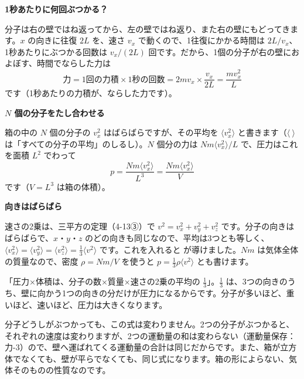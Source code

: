 \noindent\textbf{1秒あたりに何回ぶつかる？}\par\nobreak
分子は右の壁ではね返ってから、左の壁ではね返り、また右の壁にもどってきます。$x$ の向きに往復 $2L$ を、速さ $v_x$ で動くので、1往復にかかる時間は $2L/v_x$、1秒あたりにぶつかる回数は $v_x/(2L)$ 回です。だから、1個の分子が右の壁におよぼす、時間でならした力は
\[ \text{力}=\text{1回の力積}\times\text{1秒の回数}=2mv_x\times\frac{v_x}{2L}=\frac{mv_x^2}{L} \]
です（1秒あたりの力積が、ならした力です）。

\noindent\textbf{$N$ 個の分子をたし合わせる}\par\nobreak
箱の中の $N$ 個の分子の $v_x^2$ はばらばらですが、その平均を $\langle v_x^2\rangle$ と書きます（$\langle\ \rangle$ は「すべての分子の平均」のしるし）。$N$ 個分の力は $Nm\langle v_x^2\rangle/L$ で、圧力はこれを面積 $L^2$ でわって
\[ p=\frac{Nm\langle v_x^2\rangle}{L^3}=\frac{Nm\langle v_x^2\rangle}{V} \]
です（$V=L^3$ は箱の体積）。

\noindent\textbf{向きはばらばら}\par\nobreak
速さの2乗は、三平方の定理（4-13③）で $v^2=v_x^2+v_y^2+v_z^2$ です。分子の向きはばらばらで、$x$・$y$・$z$ のどの向きも同じなので、平均は3つとも等しく、$\langle v_x^2\rangle=\langle v_y^2\rangle=\langle v_z^2\rangle=\tfrac13\langle v^2\rangle$ です。これを入れると
\label{ph:熱-14:press}が導けました。$Nm$ は気体全体の質量なので、密度 $\rho=Nm/V$ を使うと $p=\tfrac13\rho\langle v^2\rangle$ とも書けます。

\begin{phyomi}[$pV=\frac{1}{3}Nm\langle v^2\rangle$]
「圧力×体積は、分子の数×質量×速さの2乗の平均の $\tfrac13$」。$\tfrac13$ は、3つの向きのうち、壁に向かう1つの向きの分だけが圧力になるからです。分子が多いほど、重いほど、速いほど、圧力は大きくなります。
\end{phyomi}

\begin{seikaku}
分子どうしがぶつかっても、この式は変わりません。2つの分子がぶつかると、それぞれの速度は変わりますが、2つの運動量の和は変わらない（運動量保存：力-3）ので、壁へ運ばれてくる運動量の合計は同じだからです。また、箱が立方体でなくても、壁が平らでなくても、同じ式になります。箱の形によらない、気体そのものの性質なのです。
\end{seikaku}


